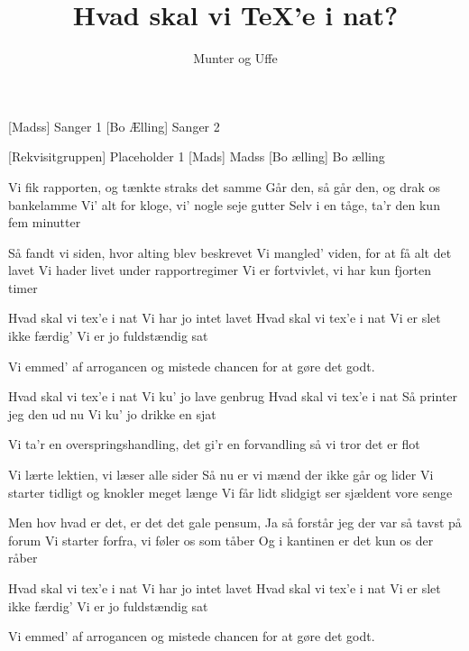 \documentclass[a4paper,11pt]{article}
\title{Hvad skal vi TeX'e i nat?}
\author{Munter og Uffe}
\begin{document}
\maketitle

\begin{roles}  
[Madss] Sanger 1
[Bo Ælling] Sanger 2
\end{roles}

\begin{props}
[Rekvisitgruppen] Placeholder 1
[Mads] Madss
[Bo ælling] Bo ælling
\end{props}

\begin{song}
 Vi fik rapporten, og tænkte straks det samme
Går den, så går den, og drak os bankelamme
Vi' alt for kloge, vi' nogle seje gutter
Selv i en tåge, ta'r den kun fem minutter

 Så fandt vi siden, hvor alting blev beskrevet
Vi mangled' viden, for at få alt det lavet
Vi hader livet under rapportregimer
Vi er fortvivlet, vi har kun fjorten timer

 Hvad skal vi tex'e i nat
 Vi har jo intet lavet
 Hvad skal vi tex'e i nat
Vi er slet ikke færdig'
 Vi er jo fuldstændig sat

 Vi emmed' af arrogancen og mistede chancen
for at gøre det godt.

 Hvad skal vi tex'e i nat
 Vi ku' jo lave genbrug
 Hvad skal vi tex'e i nat
 Så printer jeg den ud nu
 Vi ku' jo drikke en sjat

 Vi ta'r en overspringshandling, det gi'r en forvandling
så vi tror det er flot

 Vi lærte lektien, vi læser alle sider
Så nu er vi mænd der ikke går og lider
Vi starter tidligt og knokler meget længe
Vi får lidt slidgigt ser sjældent vore senge

 Men hov hvad er det, er det det gale pensum,
Ja så forstår jeg der var så tavst på forum
Vi starter forfra, vi føler os som tåber
Og i kantinen er det kun os der råber

 Hvad skal vi tex'e i nat
 Vi har jo intet lavet
 Hvad skal vi tex'e i nat
Vi er slet ikke færdig'
 Vi er jo fuldstændig sat

 Vi emmed' af arrogancen og mistede chancen
for at gøre det godt.


\end{song}
\end{document}
